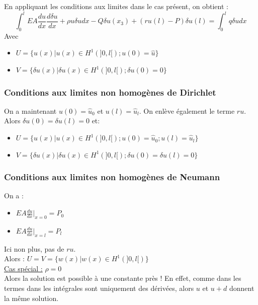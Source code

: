 \documentclass[../main.tex]{subfiles}
\begin{document}
En appliquant les conditions aux limites dans le cas présent, on obtient : \begin{equation}
    \int_0^l EA \frac{du}{dx} \frac{d\delta u}{dx} + \rho u \delta u dx - Q \delta u(x_3) + (ru(l)-P)\delta u(l) = \int_0^l q \delta u dx 
\end{equation}
Avec \begin{itemize}
    \item $U = \{u(x) \lvert u(x) \in H^1(]0,l[); u(0)=\hat{u}\}$\\
    \item $V = \{\delta u(x) \lvert \delta u(x) \in H^1(]0,l[); \delta u(0)=0\}$\\
\end{itemize}

\subsubsection{Conditions aux limites non homogènes de Dirichlet}
On a maintenant $u(0) = \hat{u}_0$ et $u(l) = \hat{u}_l$. On enlève également le terme $ru$.\\
Alors $\delta u(0) = \delta u(l) = 0$ et: \begin{itemize}
    \item $U = \{u(x) \lvert u(x) \in H^1(]0,l[); u(0)=\hat{u}_0; u(l) = \hat{u}_l\}$\\
    \item $V = \{\delta u(x) \lvert \delta u(x) \in H^1(]0,l[); \delta u(0) = \delta u(l) =0\}$\\
\end{itemize}

\subsubsection{Conditions aux limites non homogènes de Neumann}
On a : \begin{itemize}
    \item $EA \frac{du}{dx}\lvert_{x=0} = P_0$\\
    \item $EA \frac{du}{dx}\lvert_{x=l} = P_l$\\
\end{itemize}
Ici non plus, pas de $ru$.\\
Alors : $U=V = \{w(x) \lvert w(x) \in H^1(]0,l[)\}$\\

\quad \underline{Cas spécial :} \textbf{$\rho=0$}\\
Alors la solution est possible à une constante près ! En effet, comme dans les termes dans les intégrales sont uniquement des dérivées, alors $u$ et $u+d$ donnent la même solution.\\
\end{document}
